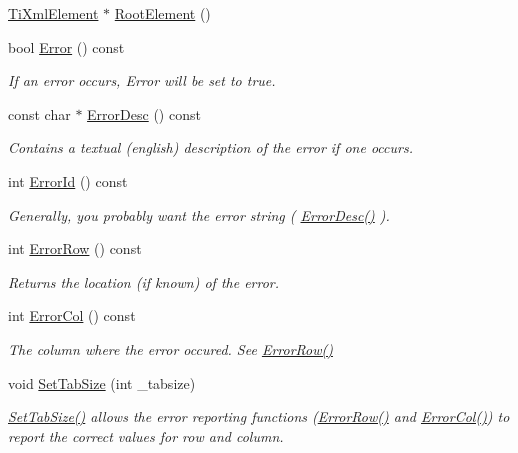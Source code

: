 \begin{DoxyCompactItemize}
\hyperlink{class_ti_xml_element}{TiXmlElement} $\ast$ \hyperlink{class_ti_xml_document_a0b43e762a23f938b06651bc90b8a1013}{RootElement} ()
\item 
bool \hyperlink{class_ti_xml_document_a6dfc01a6e5d58e56acd537dfd3bdeb29}{Error} () const 
\begin{DoxyCompactList}\small\item\em If an error occurs, Error will be set to true. \end{DoxyCompactList}\item 
const char $\ast$ \hyperlink{class_ti_xml_document_a9d0f689f6e09ea494ea547be8d79c25e}{ErrorDesc} () const 
\begin{DoxyCompactList}\small\item\em Contains a textual (english) description of the error if one occurs. \end{DoxyCompactList}\item 
int \hyperlink{class_ti_xml_document_af96fc2f3f9ec6422782bfe916c9e778f}{ErrorId} () const 
\begin{DoxyCompactList}\small\item\em Generally, you probably want the error string ( \hyperlink{class_ti_xml_document_a9d0f689f6e09ea494ea547be8d79c25e}{ErrorDesc()} ). \end{DoxyCompactList}\item 
int \hyperlink{class_ti_xml_document_af30efc75e804aa2e92fb8be3a8cb676e}{ErrorRow} () const 
\begin{DoxyCompactList}\small\item\em Returns the location (if known) of the error. \end{DoxyCompactList}\item 
int \hyperlink{class_ti_xml_document_aa90bc630ee5203c6109ca5fad3323649}{ErrorCol} () const 
\begin{DoxyCompactList}\small\item\em The column where the error occured. See \hyperlink{class_ti_xml_document_af30efc75e804aa2e92fb8be3a8cb676e}{ErrorRow()} \end{DoxyCompactList}\item 
void \hyperlink{class_ti_xml_document_a51dac56316f89b35bdb7d0d433ba988e}{SetTabSize} (int \_\-tabsize)
\begin{DoxyCompactList}\small\item\em \hyperlink{class_ti_xml_document_a51dac56316f89b35bdb7d0d433ba988e}{SetTabSize()} allows the error reporting functions (\hyperlink{class_ti_xml_document_af30efc75e804aa2e92fb8be3a8cb676e}{ErrorRow()} and \hyperlink{class_ti_xml_document_aa90bc630ee5203c6109ca5fad3323649}{ErrorCol()}) to report the correct values for row and column. \end{DoxyCompactList}\item 

\end{DoxyCompactItemize}
